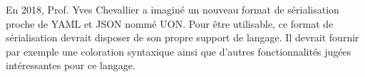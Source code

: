 En 2018, Prof. Yves Chevallier a imaginé un nouveau format de sérialisation proche de YAML et JSON nommé UON.
Pour être utilisable, ce format de sérialisation devrait disposer de son propre support de langage.
Il devrait fournir par exemple une coloration syntaxique ainsi que d’autres fonctionnalités jugées intéressantes pour ce langage.
